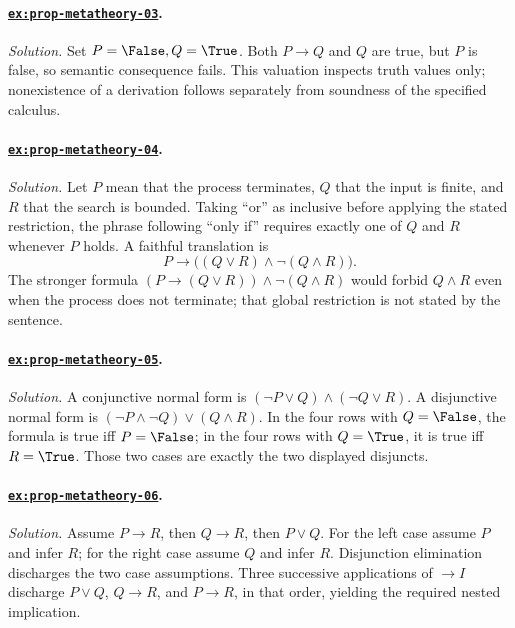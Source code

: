 \paragraph{\hyperref[ex:prop-metatheory-03]{\texttt{ex:prop-metatheory-03}}.}
\textit{Solution.}  Set \(P=\False,Q=\True\).  Both \(P\to Q\) and \(Q\) are
true, but \(P\) is false, so semantic consequence fails.  This valuation
inspects truth values only; nonexistence of a derivation follows separately
from soundness of the specified calculus.

\paragraph{\hyperref[ex:prop-metatheory-04]{\texttt{ex:prop-metatheory-04}}.}
\textit{Solution.}  Let \(P\) mean that the process terminates, \(Q\)
that the input is finite, and \(R\) that the search is bounded.  Taking
``or'' as inclusive before applying the stated restriction, the phrase
following ``only if'' requires exactly one of \(Q\) and \(R\) whenever
\(P\) holds.  A faithful translation is
\[
  P\to\bigl((Q\lor R)\land\neg(Q\land R)\bigr).
\]
The stronger formula
\((P\to(Q\lor R))\land\neg(Q\land R)\) would forbid \(Q\land R\) even when
the process does not terminate; that global restriction is not stated by the
sentence.

\paragraph{\hyperref[ex:prop-metatheory-05]{\texttt{ex:prop-metatheory-05}}.}
\textit{Solution.}  A conjunctive normal form is
\((\neg P\lor Q)\land(\neg Q\lor R)\).  A disjunctive normal form is
\((\neg P\land\neg Q)\lor(Q\land R)\).  In the four rows with
\(Q=\False\), the formula is true iff \(P=\False\); in the four rows
with \(Q=\True\), it is true iff \(R=\True\).  Those two cases are
exactly the two displayed
disjuncts.

\paragraph{\hyperref[ex:prop-metatheory-06]{\texttt{ex:prop-metatheory-06}}.}
\textit{Solution.}  Assume \(P\to R\), then \(Q\to R\), then \(P\lor Q\).
For the left case assume \(P\) and infer \(R\); for the right case assume
\(Q\) and infer \(R\).  Disjunction elimination discharges the two case
assumptions.  Three successive applications of \(\to I\) discharge
\(P\lor Q\), \(Q\to R\), and \(P\to R\), in that order, yielding the required
nested implication.

